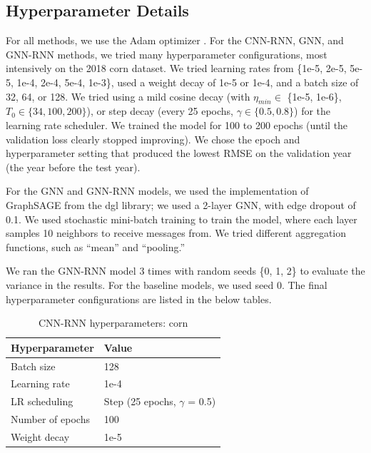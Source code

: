 \subsection{Hyperparameter Details}

For all methods, we use the Adam optimizer \cite{kingma2014adam}. For the CNN-RNN, GNN, and GNN-RNN methods, we tried many hyperparameter configurations, most intensively on the 2018 corn dataset. We tried learning rates from \{1e-5, 2e-5, 5e-5, 1e-4, 2e-4, 5e-4, 1e-3\}, used a weight decay of 1e-5 or 1e-4, and a batch size of 32, 64, or 128. We tried using a mild cosine decay (with $\eta_{min} \in $ \{1e-5, 1e-6\}, $T_0 \in \{34, 100, 200\}$), or step decay (every 25 epochs, $\gamma \in \{0.5, 0.8\}$) for the learning rate scheduler. We trained the model for 100 to 200 epochs (until the validation loss clearly stopped improving). We chose the epoch and hyperparameter setting that produced the lowest RMSE on the validation year (the year before the test year).

For the GNN and GNN-RNN models, we used the implementation of GraphSAGE from the dgl library; we used a 2-layer GNN, with edge dropout of 0.1. We used stochastic mini-batch training to train the model, where each layer samples 10 neighbors to receive messages from. We tried different aggregation functions, such as ``mean'' and ``pooling.''



We ran the GNN-RNN model 3 times with random seeds \{0, 1, 2\} to evaluate the variance in the results. For the baseline models, we used seed 0. The final hyperparameter configurations are listed in the below tables.

\begin{table}[H]
\centering
\begin{tabular}{|l|l|} \hline
\textbf{Hyperparameter} & \textbf{Value} \\ \hline
Batch size & 128 \\ \hline
Learning rate & 1e-4\\ \hline
LR scheduling & Step (25 epochs, $\gamma$ = 0.5)  \\ \hline
Number of epochs & 100 \\ \hline
Weight decay & 1e-5 \\ \hline
\end{tabular}
\caption{CNN-RNN hyperparameters: corn}
\label{hyperparams_cnn-rnn_corn}
\end{table}

